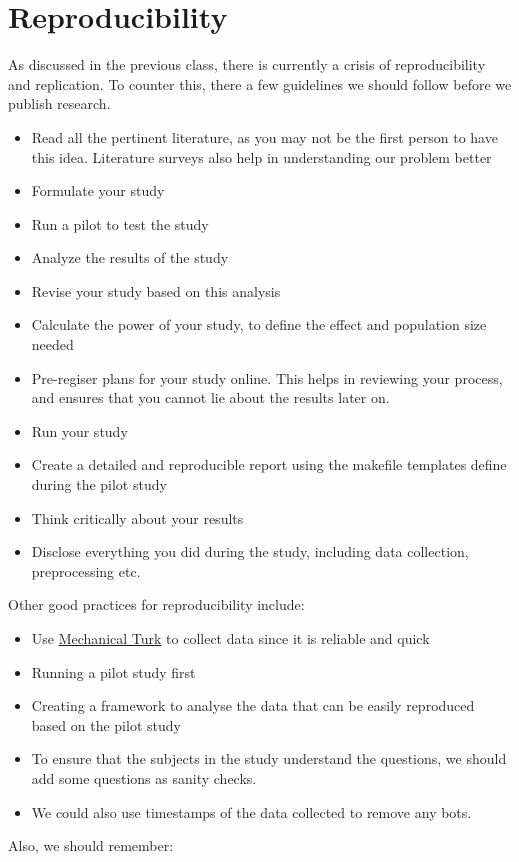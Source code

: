 \section{Reproducibility}
As discussed in the previous class, there is currently a crisis of reproducibility and replication. To counter this, there a few guidelines we should follow before we publish research. 
\begin{itemize}
    \item Read all the pertinent literature, as you may not be the first person to have this idea. Literature surveys also help in understanding our problem better
    \item Formulate your study
    \item Run a pilot to test the study
    \item Analyze the results of the study
    \item Revise your study based on this analysis 
    \item Calculate the power of your study, to define the effect and population size needed 
    \item Pre-regiser plans for your study online. This helps in reviewing your process, and ensures that you cannot lie about the results later on.
    \item Run your study 
    \item Create a detailed and reproducible report using the makefile templates define during the pilot study
    \item Think critically about your results
    \item Disclose everything you did during the study, including data collection, preprocessing etc. 
    
\end{itemize}
Other good practices for reproducibility include:
\begin{itemize}
    \item Use \href{https://www.mturk.com/}{Mechanical Turk} to collect data since it is reliable and quick
    \item Running a pilot study first
    \item Creating a framework to analyse the data that can be easily reproduced based on the pilot study 
    \item To ensure that the subjects in the study understand the questions, we should add some questions as sanity checks. 
    \item We could also use timestamps of the data collected to remove any bots.
\end{itemize}
Also, we should remember: \newline

